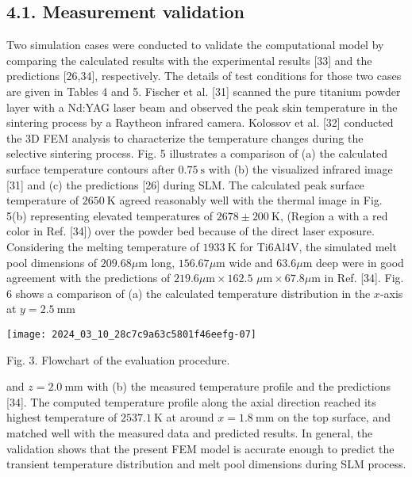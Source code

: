 \documentclass[10pt]{article}
\begin{document}
\subsection*{4.1. Measurement validation}
Two simulation cases were conducted to validate the computational model by comparing the calculated results with the experimental results [33] and the predictions [26,34], respectively. The details of test conditions for those two cases are given in Tables 4 and 5. Fischer et al. [31] scanned the pure titanium powder layer with a Nd:YAG laser beam and observed the peak skin temperature in the sintering process by a Raytheon infrared camera. Kolossov et al. [32] conducted the 3D FEM analysis to characterize the temperature changes during the selective sintering process. Fig. 5 illustrates a comparison of (a) the calculated surface temperature contours after $0.75 \mathrm{~s}$ with (b) the visualized infrared image [31] and (c) the predictions [26] during SLM. The calculated peak surface temperature of $2650 \mathrm{~K}$ agreed reasonably well with the thermal image in Fig. 5(b) representing elevated temperatures of $2678 \pm 200 \mathrm{~K}$, (Region a with a red color in Ref. [34]) over the powder bed because of the direct laser exposure. Considering the melting temperature of $1933 \mathrm{~K}$ for Ti6Al4V, the simulated melt pool dimensions of $209.68 \mu \mathrm{m}$ long, $156.67 \mu \mathrm{m}$ wide and $63.6 \mu \mathrm{m}$ deep were in good agreement with the predictions of $219.6 \mu \mathrm{m} \times 162.5$ $\mu \mathrm{m} \times 67.8 \mu \mathrm{m}$ in Ref. [34]. Fig. 6 shows a comparison of (a) the calculated temperature distribution in the $x$-axis at $y=2.5 \mathrm{~mm}$

\begin{center}
\texttt{[image: 2024\_03\_10\_28c7c9a63c5801f46eefg-07]}
\end{center}

Fig. 3. Flowchart of the evaluation procedure.

and $z=2.0 \mathrm{~mm}$ with (b) the measured temperature profile and the predictions [34]. The computed temperature profile along the axial direction reached its highest temperature of $2537.1 \mathrm{~K}$ at around $x=1.8 \mathrm{~mm}$ on the top surface, and matched well with the measured data and predicted results. In general, the validation shows that the present FEM model is accurate enough to predict the transient temperature distribution and melt pool dimensions during SLM process.
\end{document}
